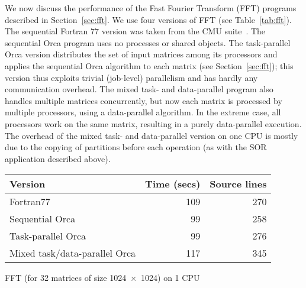 \documentclass{acmtrans2e}
\begin{document}
We now discuss the performance of the Fast Fourier Transform (FFT)
programs described in Section~\ref{sec:fft}.
We use four versions of FFT (see Table~\ref{tab:fft}).
The sequential Fortran 77 version was taken from the CMU suite~\cite{dinda94}.
The sequential Orca program uses no processes or shared objects.
The task-parallel Orca version distributes the set of input matrices
among its processors and applies the sequential Orca algorithm
to each matrix (see Section~\ref{sec:fft}); this version thus
exploits trivial (job-level) parallelism and has hardly any
communication overhead.
The mixed task- and data-parallel program also handles multiple matrices
concurrently, but now each matrix is processed by multiple processors,
using a data-parallel algorithm. In the extreme case, all processors
work on the same matrix, resulting in a purely data-parallel execution.
The overhead of the mixed task- and data-parallel version on one CPU is mostly due to
the copying of partitions before each operation (as with the SOR application
described above).


\begin{acmtable}{10cm}
\centering
\begin{tabular*}{10cm}{@{\extracolsep\fill}l|r r}
{\bf Version} & {\bf Time (secs)} & {\bf Source lines} \\
\hline
Fortran77 & 109 & 270 \\
Sequential Orca & 99 & 258 \\
Task-parallel Orca & 99 & 276 \\
Mixed task/data-parallel Orca & 117 & 345 \\
\end{tabular*}
\caption{FFT (for 32 matrices of size 1024~$\times$~1024) on 1 CPU}
\label{tab:fft}
\end{acmtable}
\end{document}
